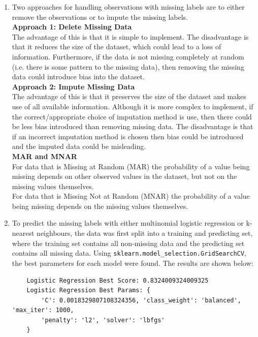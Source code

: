 \documentclass{article}
\begin{document}
\begin{enumerate}[label=\alph*)]
    \item Two approaches for handling observations with missing labels are to either remove the observations or to impute the missing labels.\\

    \textbf{Approach 1: Delete Missing Data}\\
    The advantage of this is that it is simple to implement. The disadvantage is that it reduces the size of the dataset, which could lead to a loss of information. Furthermore, if the data is not missing completely at random (i.e. there is some pattern to the missing data), then removing the missing data could introduce bias into the dataset.\\

    \textbf{Approach 2: Impute Missing Data}\\
    The advantage of this is that it preserves the size of the dataset and makes use of all available information. Although it is more complex to implement, if the correct/appropriate choice of imputation method is use, then there could be less bias introduced than removing missing data. The disadvantage is that if an incorrect imputation method is chosen then bias could be introduced and the imputed data could be misleading.\\

    \textbf{MAR and MNAR}\\
    For data that is Missing at Random (MAR) the probability of a value being missing depends on other observed values in the dataset, but not on the missing values themselves.\\

    For data that is Missing Not at Random (MNAR) the probability of a value being missing depends on the missing values themselves.

    \item To predict the missing labels with either multinomial logistic regression or k-nearest neighbours, the data was first split into a training and predicting set, where the training set contains all non-missing data and the predicting set contains all missing data. Using \verb|sklearn.model_selection.GridSearchCV|, the best parameters for each model were found. The results are shown below:
    \begin{verbatim}
    Logistic Regression Best Score: 0.8324009324009325
    Logistic Regression Best Params: {
        'C': 0.0018329807108324356, 'class_weight': 'balanced', 'max_iter': 1000, 
        'penalty': 'l2', 'solver': 'lbfgs'
    }


\end{verbatim}
\end{enumerate}
\end{document}
